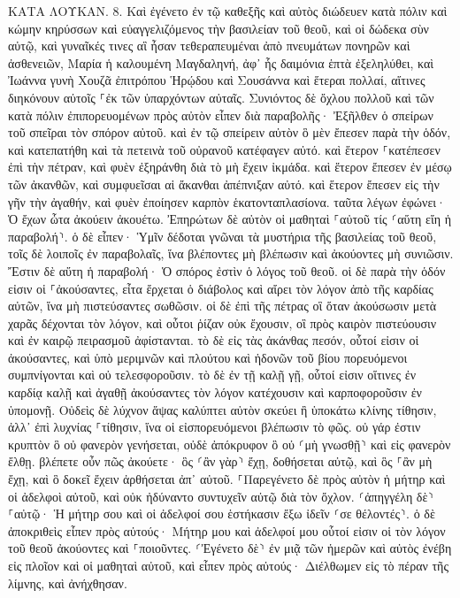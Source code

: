 \documentclass[twoside, 9pt]{extreport}
\begin{document}
ΚΑΤΑ ΛΟΥΚΑΝ.
8.
Καὶ ἐγένετο ἐν τῷ καθεξῆς καὶ αὐτὸς διώδευεν κατὰ πόλιν καὶ κώμην κηρύσσων καὶ εὐαγγελιζόμενος τὴν βασιλείαν τοῦ θεοῦ, καὶ οἱ δώδεκα σὺν αὐτῷ, 
καὶ γυναῖκές τινες αἳ ἦσαν τεθεραπευμέναι ἀπὸ πνευμάτων πονηρῶν καὶ ἀσθενειῶν, Μαρία ἡ καλουμένη Μαγδαληνή, ἀφ᾽ ἧς δαιμόνια ἑπτὰ ἐξεληλύθει, 
καὶ Ἰωάννα γυνὴ Χουζᾶ ἐπιτρόπου Ἡρῴδου καὶ Σουσάννα καὶ ἕτεραι πολλαί, αἵτινες διηκόνουν αὐτοῖς ⸀ἐκ τῶν ὑπαρχόντων αὐταῖς. 
Συνιόντος δὲ ὄχλου πολλοῦ καὶ τῶν κατὰ πόλιν ἐπιπορευομένων πρὸς αὐτὸν εἶπεν διὰ παραβολῆς· 
Ἐξῆλθεν ὁ σπείρων τοῦ σπεῖραι τὸν σπόρον αὐτοῦ. καὶ ἐν τῷ σπείρειν αὐτὸν ὃ μὲν ἔπεσεν παρὰ τὴν ὁδόν, καὶ κατεπατήθη καὶ τὰ πετεινὰ τοῦ οὐρανοῦ κατέφαγεν αὐτό. 
καὶ ἕτερον ⸀κατέπεσεν ἐπὶ τὴν πέτραν, καὶ φυὲν ἐξηράνθη διὰ τὸ μὴ ἔχειν ἰκμάδα. 
καὶ ἕτερον ἔπεσεν ἐν μέσῳ τῶν ἀκανθῶν, καὶ συμφυεῖσαι αἱ ἄκανθαι ἀπέπνιξαν αὐτό. 
καὶ ἕτερον ἔπεσεν εἰς τὴν γῆν τὴν ἀγαθήν, καὶ φυὲν ἐποίησεν καρπὸν ἑκατονταπλασίονα. ταῦτα λέγων ἐφώνει· Ὁ ἔχων ὦτα ἀκούειν ἀκουέτω. 
Ἐπηρώτων δὲ αὐτὸν οἱ μαθηταὶ ⸀αὐτοῦ τίς ⸂αὕτη εἴη ἡ παραβολή⸃. 
ὁ δὲ εἶπεν· Ὑμῖν δέδοται γνῶναι τὰ μυστήρια τῆς βασιλείας τοῦ θεοῦ, τοῖς δὲ λοιποῖς ἐν παραβολαῖς, ἵνα βλέποντες μὴ βλέπωσιν καὶ ἀκούοντες μὴ συνιῶσιν. 
Ἔστιν δὲ αὕτη ἡ παραβολή· Ὁ σπόρος ἐστὶν ὁ λόγος τοῦ θεοῦ. 
οἱ δὲ παρὰ τὴν ὁδόν εἰσιν οἱ ⸀ἀκούσαντες, εἶτα ἔρχεται ὁ διάβολος καὶ αἴρει τὸν λόγον ἀπὸ τῆς καρδίας αὐτῶν, ἵνα μὴ πιστεύσαντες σωθῶσιν. 
οἱ δὲ ἐπὶ τῆς πέτρας οἳ ὅταν ἀκούσωσιν μετὰ χαρᾶς δέχονται τὸν λόγον, καὶ οὗτοι ῥίζαν οὐκ ἔχουσιν, οἳ πρὸς καιρὸν πιστεύουσιν καὶ ἐν καιρῷ πειρασμοῦ ἀφίστανται. 
τὸ δὲ εἰς τὰς ἀκάνθας πεσόν, οὗτοί εἰσιν οἱ ἀκούσαντες, καὶ ὑπὸ μεριμνῶν καὶ πλούτου καὶ ἡδονῶν τοῦ βίου πορευόμενοι συμπνίγονται καὶ οὐ τελεσφοροῦσιν. 
τὸ δὲ ἐν τῇ καλῇ γῇ, οὗτοί εἰσιν οἵτινες ἐν καρδίᾳ καλῇ καὶ ἀγαθῇ ἀκούσαντες τὸν λόγον κατέχουσιν καὶ καρποφοροῦσιν ἐν ὑπομονῇ. 
Οὐδεὶς δὲ λύχνον ἅψας καλύπτει αὐτὸν σκεύει ἢ ὑποκάτω κλίνης τίθησιν, ἀλλ᾽ ἐπὶ λυχνίας ⸀τίθησιν, ἵνα οἱ εἰσπορευόμενοι βλέπωσιν τὸ φῶς. 
οὐ γάρ ἐστιν κρυπτὸν ὃ οὐ φανερὸν γενήσεται, οὐδὲ ἀπόκρυφον ὃ οὐ ⸂μὴ γνωσθῇ⸃ καὶ εἰς φανερὸν ἔλθῃ. 
βλέπετε οὖν πῶς ἀκούετε· ὃς ⸂ἂν γὰρ⸃ ἔχῃ, δοθήσεται αὐτῷ, καὶ ὃς ⸀ἂν μὴ ἔχῃ, καὶ ὃ δοκεῖ ἔχειν ἀρθήσεται ἀπ᾽ αὐτοῦ. 
⸀Παρεγένετο δὲ πρὸς αὐτὸν ἡ μήτηρ καὶ οἱ ἀδελφοὶ αὐτοῦ, καὶ οὐκ ἠδύναντο συντυχεῖν αὐτῷ διὰ τὸν ὄχλον. 
⸂ἀπηγγέλη δὲ⸃ ⸀αὐτῷ· Ἡ μήτηρ σου καὶ οἱ ἀδελφοί σου ἑστήκασιν ἔξω ἰδεῖν ⸂σε θέλοντές⸃. 
ὁ δὲ ἀποκριθεὶς εἶπεν πρὸς αὐτούς· Μήτηρ μου καὶ ἀδελφοί μου οὗτοί εἰσιν οἱ τὸν λόγον τοῦ θεοῦ ἀκούοντες καὶ ⸀ποιοῦντες. 
⸂Ἐγένετο δὲ⸃ ἐν μιᾷ τῶν ἡμερῶν καὶ αὐτὸς ἐνέβη εἰς πλοῖον καὶ οἱ μαθηταὶ αὐτοῦ, καὶ εἶπεν πρὸς αὐτούς· Διέλθωμεν εἰς τὸ πέραν τῆς λίμνης, καὶ ἀνήχθησαν. 
\end{document}
